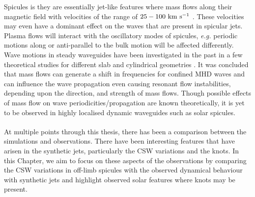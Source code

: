 \documentclass[12pt]{ociamthesis}
\newcommand{\kms}{~\rm{km ~s^{-1}}}
\newcommand{\np}{\\ \\}
\begin{document}
%
Spicules is they are essentially jet-like features where mass flows along their magnetic field with velocities of the range of $25-100\kms$  \citep{Beckers1972ARAA1073B, Sterling2000SoPh19679S, Pereira2012}. These velocities may even have a dominant effect on the waves that are present in spicular jets. Plasma flows will interact with the oscillatory modes of spicules, \textit{e.g.} periodic motions along or anti-parallel to the bulk motion will be affected differently. Wave motions in steady waveguides have been investigated in the past in a few theoretical studies for different slab and cylindrical geometries \citep{Narayanan1991,nakariakov1995, terrahomem2003, soler2008}. It was concluded that mass flows can generate a shift in frequencies for confined MHD waves and can influence the wave propagation even causing resonant flow instabilities, depending upon the direction, and strength of mass flows. Though possible effects of mass flow on wave periodicities/propagation are known theoretically, it is yet to be observed in highly localised dynamic waveguides such as solar spicules. \np
%
At multiple points through this thesis, there has been a comparison between the simulations and observations. There have been interesting features that have arisen in the synthetic jets, particularly the CSW variations and the knots. In this Chapter, we aim to focus on these aspects of the observations by comparing the CSW variations in off-limb spicules with the observed dynamical behaviour with synthetic jets and highlight observed solar features where knots may be present. \np
\end{document}
